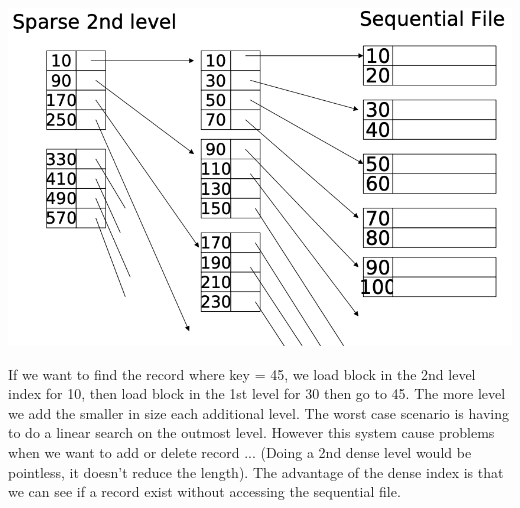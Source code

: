 \documentclass[12pt,a4paper]{article}
\begin{document}
\begin{center}
\includegraphics[scale=0.34]{img/img25.png}
\end{center}
If we want to find the record where key = 45, we load block in the 2nd level index for 10, then load block in the 1st level for 30 then go to 45. The more level we add the smaller in size each additional level. The worst case scenario is having to do a linear search on the outmost level.
However this system cause problems when we want to add or delete record ...
(Doing a 2nd dense level would be pointless, it doesn't reduce the length). The advantage of the dense index is that we can see if a record exist without accessing the sequential file.
\end{document}
